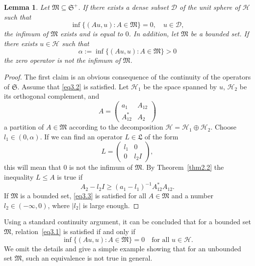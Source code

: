 \documentclass[12pt, a4paper, reqno, twoside]{amsart}
\numberwithin{equation}{section}
\newcommand{\frakS}{\mathfrak S}
\newcommand{\frakL}{\mathfrak L}
\newcommand{\frakM}{\mathfrak M}
\newtheorem{lemma}[theorem]{Lemma}
\theoremstyle{definition}
\theoremstyle{remark}
\theoremstyle{mystyle}
\begin{document}
\begin{lemma}
\label{lem3.1}
Let $\frakM\subseteq\frakS^{+}$. If there exists a dense subset
$\mathscr D$ of the unit sphere of $\mathscr H$ such that
\begin{equation}
\label{eq3.1}
\inf\bigl\{(Au,u) : A\in\frakM\bigr\}=0,\quad u\in\mathscr D,  
\end{equation}
the infimum of $\frakM$ exists and is equal to $0$. In addition, let
$\frakM$ be a bounded set. If there exists $u\in\mathscr H$ such that
\begin{equation}
  \label{eq3.2}
  \alpha:=\inf\bigl\{(Au,u) : A\in\frakM\bigr\} > 0
\end{equation}
the zero operator is not the infimum of $\frakM$.
\end{lemma}

\begin{proof}
The first claim is an obvious consequence of the continuity of the
operators of $\frakS$. Assume that \eqref{eq3.2} is satisfied. Let
$\mathscr H_{1}$ be the space spanned by $u$, $\mathscr H_{2}$ be its
orthogonal complement, and 
\[
A = \begin{pmatrix} a_{1} & A_{12} \\ A_{12}^{\ast} & A_{2} \end{pmatrix}
\]  
a partition of $A\in\frakM$ according to the decomposition $\mathscr
H=\mathscr H_{1}\oplus\mathscr H_{2}$. Choose $l_{1}\in
(0,\alpha)$. If we can find an operator $L\in\frakL$ of the form
\[
L = \begin{pmatrix} l_{1} & 0 \\ 0 & l_{2}I \end{pmatrix},
\] 
this will mean that $0$ is not the infimum of $\frakM$. By
Theorem~\ref{thm2.2} the inequality $L\leq A$ is true if
\begin{equation}
\label{eq3.3}  
A_{2}-l_{2}I \geq (a_{1}-l_{1})^{-1} A_{12}^{\ast} A_{12}.
\end{equation}
If $\frakM$ is a bounded set, \eqref{eq3.3} is satisfied for all
$A\in\frakM$ and a number $l_{2}\in(-\infty,0)$, where $|l_{2}|$ is
large enough.
\end{proof}  

Using a standard continuity argument, it can be concluded that for a
bounded set $\frakM$, relation~\eqref{eq3.1} is satisfied if and only
if
\begin{equation}
\label{eq3.3a}  
  \inf\bigl\{(Au,u) : A\in\frakM \bigr\} = 0
  \quad\text{for all $u\in\mathscr H$.}
\end{equation}
We omit the details and give a simple example showing that for an
unbounded set $\frakM$, such an equivalence is not true in general.
\end{document}
